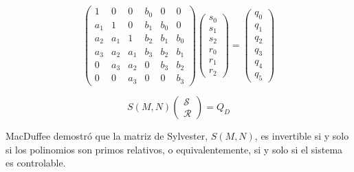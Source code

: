             \begin{equation*}
                \begin{pmatrix}
                    1 & 0 & 0 & b_{0} & 0 & 0 \\
                    a_{1} & 1 & 0 & b_{1} & b_{0} & 0 \\
                    a_{2} & a_{1} & 1 & b_{2} & b_{1} & b_{0} \\
                    a_{3} & a_{2} & a_{1} & b_{3} & b_{2} & b_{1} \\
                    0 & a_{3} & a_{2} & 0 & b_{3} & b_{2} \\
                    0 & 0 & a_{3} & 0 & 0 & b_{3}
                \end{pmatrix}
                \begin{pmatrix}
                    s_0 \\
                    s_1 \\
                    s_2 \\
                    r_0 \\
                    r_1 \\
                    r_2
                \end{pmatrix} =
                \begin{pmatrix}
                    q_0 \\
                    q_1 \\
                    q_2 \\
                    q_3 \\
                    q_4 \\
                    q_5
                \end{pmatrix}
            \end{equation*}

            \begin{equation*}
                S(M, N)
                \begin{pmatrix}
                    \mathcal{S} \\
                    \mathcal{R}
                \end{pmatrix} =
                Q_D
            \end{equation*}

            MacDuffee demostró que la matriz de Sylvester, $S(M, N)$, es invertible si y solo si los polinomios son primos relativos, o equivalentemente, si y solo si el sistema es controlable.

